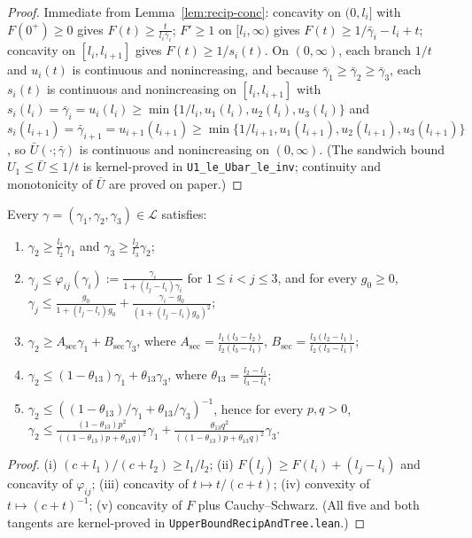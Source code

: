 \begin{proof}
Immediate from Lemma~\ref{lem:recip-conc}: concavity on $(0, l_i]$ with $F(0^+) \ge 0$ gives $F(t) \ge \frac{t}{l_i\bar{\gamma}_i}$; $F' \ge 1$ on $[l_i,\infty)$ gives $F(t) \ge 1/\bar{\gamma}_i - l_i + t$; concavity on $[l_i,l_{i+1}]$ gives $F(t) \ge 1/s_i(t)$. On $(0,\infty)$, each branch $1/t$ and $u_i(t)$ is continuous and nonincreasing, and because $\bar{\gamma}_1 \ge \bar{\gamma}_2 \ge \bar{\gamma}_3$, each $s_i(t)$ is continuous and nonincreasing on $[l_i, l_{i+1}]$ with $s_i(l_i) = \bar{\gamma}_i = u_i(l_i) \ge \min\{1/l_i, u_1(l_i), u_2(l_i), u_3(l_i)\}$ and $s_i(l_{i+1}) = \bar{\gamma}_{i+1} = u_{i+1}(l_{i+1}) \ge \min\{1/l_{i+1}, u_1(l_{i+1}), u_2(l_{i+1}), u_3(l_{i+1})\}$, so $\bar{U}(\cdot;\bar{\gamma})$ is continuous and nonincreasing on $(0,\infty)$. (The sandwich bound $U_1 \le \bar{U} \le 1/t$ is kernel-proved in \texttt{U1\_le\_Ubar\_le\_inv}; continuity and monotonicity of $\bar{U}$ are proved on paper.)
\end{proof}

\begin{lemma}\label{lem:lens}
Every $\gamma = (\gamma_1,\gamma_2,\gamma_3) \in \mathcal{L}$ satisfies:
\begin{enumerate}
  \item[(i)] $\gamma_2 \ge \frac{l_1}{l_2}\gamma_1$ and $\gamma_3 \ge \frac{l_2}{l_3}\gamma_2$;
  \item[(ii)] $\gamma_j \le \varphi_{ij}(\gamma_i) := \frac{\gamma_i}{1 + (l_j - l_i)\gamma_i}$ for $1 \le i < j \le 3$, and for every $g_0 \ge 0$, $\gamma_j \le \frac{g_0}{1+(l_j-l_i)g_0} + \frac{\gamma_i - g_0}{(1+(l_j-l_i)g_0)^2}$;
  \item[(iii)] $\gamma_2 \ge A_{\mathrm{sec}}\gamma_1 + B_{\mathrm{sec}}\gamma_3$, where $A_{\mathrm{sec}} = \frac{l_1(l_3-l_2)}{l_2(l_3-l_1)}$, $B_{\mathrm{sec}} = \frac{l_3(l_2-l_1)}{l_2(l_3-l_1)}$;
  \item[(iv)] $\gamma_2 \le (1-\theta_{13})\gamma_1 + \theta_{13}\gamma_3$, where $\theta_{13} = \frac{l_2-l_1}{l_3-l_1}$;
  \item[(v)] $\gamma_2 \le ((1-\theta_{13})/\gamma_1 + \theta_{13}/\gamma_3)^{-1}$, hence for every $p, q > 0$, $\gamma_2 \le \frac{(1-\theta_{13})p^2}{((1-\theta_{13})p + \theta_{13}q)^2}\gamma_1 + \frac{\theta_{13}q^2}{((1-\theta_{13})p + \theta_{13}q)^2}\gamma_3$.
\end{enumerate}
\end{lemma}

\begin{proof}
(i) $(c+l_1)/(c+l_2) \ge l_1/l_2$; (ii) $F(l_j) \ge F(l_i) + (l_j-l_i)$ and concavity of $\varphi_{ij}$; (iii) concavity of $t \mapsto t/(c+t)$; (iv) convexity of $t \mapsto (c+t)^{-1}$; (v) concavity of $F$ plus Cauchy--Schwarz. (All five and both tangents are kernel-proved in \texttt{UpperBoundRecipAndTree.lean}.)
\end{proof}

